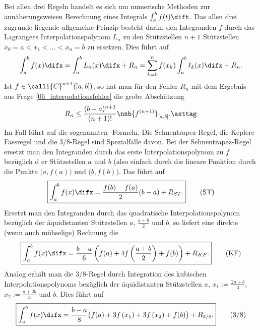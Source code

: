   \begin{antwort}
    Bei allen drei Regeln handelt es sich um numerische Methoden 
    zur annäherungsweisen Berechnung eines Integrals 
    $\int_a^b f(t) \dift$. Das allen drei zugrunde liegende 
    allgemeine Prinzip besteht darin, den Integranden $f$ durch 
    das Lagrange\sch es Interpolationspolynom $L_n$ zu den Stützstellen 
    $n+1$ Stützstellen $x_0=a < x_1<  \ldots< x_n=b$ 
    zu ersetzen. Dies führt auf 
    \[
    \int_a^b f(x)\difx = \int_a^b L_n(x) \difx + R_n = 
    \sum_{k=0}^n f(x_k) \int_a^b \ell_k (x) \difx + R_n. 
    \]
    Ist $f\in \calli{C}^{n+1} ([a,b])$, so hat man  
    für den Fehler $R_n$ mit dem Ergebnis 
    aus Frage \ref{06_interpolationsfehler} die grobe 
    Abschätzung 
    \[
    R_n \le \frac{(b-a)^{n+2}}{(n+1)!} \nnb{f^{(n+1)}}_{[a,b]}. 
    \asttag
    \]
    Im Fall  führt 
    {\astref} auf die sogenannten -Formeln. 
    Die Sehnentrapez-Regel, die Kepler\sch e Fassregel 
    und die $3/8$-Regel sind Spezialfälle davon. 
    Bei der Sehnentrapez-Regel ersetzt man den Integranden 
    durch das erste Interpolationspolynom zu $f$ bezüglich d
    er Stützstellen $a$ und $b$ (also einfach durch die lineare 
    Funktion durch die Punkte $\bigl( a, f(a) \bigr)$ und 
    $\bigl( b, f(b) \bigr )$. Das führt auf 
    \begin{equation} \boxed{
        \int_a^b f(x) \difx = \frac{f(b)-f(a)}{2} (b-a) + R_{ST}.
      }
      \tag{ST}
    \end{equation} 
    Ersetzt man den Integranden durch 
    das quadratische Interpolationspolynom bezüglich der 
    äquidistanten Stützstellen $a$, $\frac{a+b}{2}$ und $b$, so liefert  
    eine direkte (wenn auch mühselige) Rechnung die 
    \begin{equation}
      \boxed{
        \int_a^b f(x) \difx = \frac{b-a}{6} 
        \left( f(a)+4f\left( \frac{a+b}{2} \right) + f(b) \right) + R_{KF}.
      }
      \tag{KF}
    \end{equation}
    Analog erhält man die $3/8$-Regel durch Integration des 
    kubischen Interpolationspolynoms bezüglich der 
    äquidistanten Stützstellen $a$, $x_1:=\frac{2a+b}{3}$, 
    $x_2:=\frac{a+2b}{3}$ und $b$. Dies führt auf 
    \begin{equation}
      \boxed{
        \int_a^b f(x) \difx = \frac{b-a}{8} 
        \bigl( f(a)+3f\left( x_1\right) +
        3f\left( x_2\right) +
        f(b) \bigr) + R_{3/8}.}
      \tag{$3/8$}
    \end{equation}


\end{antwort}
